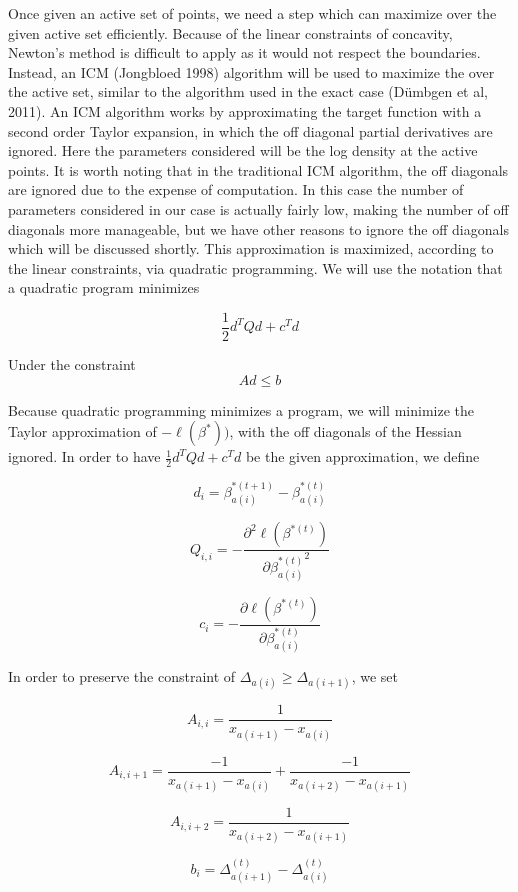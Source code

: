 \documentclass[12pt]{article}
\numberwithin{equation}{section}
\begin{document}
	Once given an active set of points, we need a step which can  maximize over the given active set efficiently. Because of the linear constraints of concavity, Newton's method is difficult to apply as it would not respect the boundaries. Instead, an ICM (Jongbloed 1998) algorithm will be used to maximize the over the active set, similar to the algorithm used in the exact case (D\"umbgen et al, 2011). An ICM algorithm works by approximating the target function with a second order Taylor expansion, in which the off diagonal partial derivatives are ignored. Here the parameters considered will be the log density at the active points. It is worth noting that in the traditional ICM algorithm, the off diagonals are ignored due to the expense of computation. In this case the number of parameters considered in our case is actually fairly low, making the number of off diagonals more manageable, but we have other reasons to ignore the off diagonals which will be discussed shortly. This approximation is maximized, according to the linear constraints, via quadratic programming. We will use the notation that a quadratic program minimizes
	
	\[ \frac{1}{2} d^T Q d + c^T d
	\]
	
	Under the constraint \[ A d \leq b\]
	
	Because quadratic programming minimizes a program, we will minimize the Taylor approximation of $-\ell(\beta^*))$, with the off diagonals of the Hessian ignored. In order to have $\frac{1}{2} d^T Q d + c^T d$ be the given approximation, we define
	
	\[ d_i = \beta^{*(t+1)}_{a(i)} - \beta^{*(t)}_{a(i)}
	\]
	
	\[Q_{i,i} = - \frac{\partial^2 \ell(\beta^{*(t)} )} {\partial {\beta^{*(t)}_{a(i)}}^2}
	\]
	 
	\[c_i = -\frac{\partial \ell(\beta^{*(t)})} {\partial \beta_{a(i)}^{*(t)} }
	\]
	
	In order to preserve the constraint of $\Delta_{a(i)} \geq \Delta_{a(i+1)}$, we set 
	
	\[ A_{i,i} = \frac{1}{x_{a(i+1)} - x_{a(i)} }
	\]
	
	\[ A_{i, i + 1} = \frac{-1}{x_{a(i+1)} - x_{a(i)} } + \frac{-1}{x_{a(i+2)} - x_{a(i + 1)} }
	\]
	
	\[ A_{i, i + 2} = \frac{1}{x_{a(i+2)} - x_{a(i + 1)} }
	\]
	
	\[ b_i =\Delta_{a(i + 1)}^{(t)} - \Delta_{a(i)}^{(t)}
	\]
	
\end{document}
